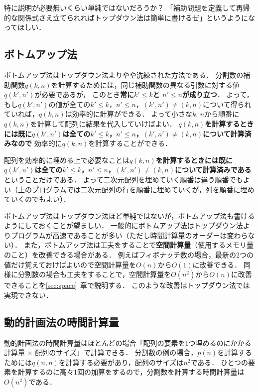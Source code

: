 \documentclass[a4paper,twoside,onecolumn,openany,article]{memoir}
\theoremstyle{remark}
\begin{document}

特に説明が必要無いくらい単純ではないだろうか？
「補助問題を定義して再帰的な関係式さえ立てられればトップダウン法は簡単に書けるぜ」というようになってほしい．

\subsection{ボトムアップ法}
ボトムアップ法はトップダウン法よりやや洗練された方法である．
分割数の補助関数$q(k,n)$を計算するためには，同じ補助関数の異なる引数に対する値$q(k',n')$が必要であるが，
このとき\textbf{常に$k'\le k$と $n'\le n$が成り立つ}．
よって，もし$q(k',n')$の値が全ての$k'\le k$，$n'\le n$，$(k',n')\ne(k,n)$について得られていれば，$q(k,n)$は効率的に計算ができる．
よって小さな$k$, $n$から順番に$q(k,n)$を計算して配列に結果を代入していけばよい．
\textbf{$q(k, n)$を計算するときには既に$q(k', n')$は全ての$k'\le k$，$n'\le n$，$(k',n')\ne (k,n)$について計算済みなので}
効率的に$q(k,n)$を計算することができる．


配列を効率的に埋める上で必要なことは\textbf{$q(k, n)$を計算するときには既に$q(k', n')$は全ての$k'\le k$，$n'\le n$，$(k',n')\ne (k,n)$について計算済みである}
ということだけである．
よって二次元配列を埋めていく順番は違う順番でもよい（上のプログラムでは二次元配列の行を順番に埋めていくが，列を順番に埋めていくのでもよい）．

ボトムアップ法はトップダウン法ほど単純ではないが，ボトムアップ法も書けるようにしておくことが望ましい．
一般的にボトムアップ法はトップダウン法よりプログラムが高速であることが多い（ただし時間計算量のオーダーは変わらない）．
また，ボトムアップ法は工夫をすることで\textbf{空間計算量}（使用するメモリ量のこと）を改善できる場合がある．
例えばフィボナッチ数の場合，最新の2つの値だけ覚えておけばよいので空間計算量を$O(n)$から$O(1)$に改善できる．
同様に分割数の場合も工夫をすることで，空間計算量を$O(n^2)$から$O(n)$に改善できることを\ref{sec:space}~章で説明する．
このような改善はトップダウン法では実現できない．


\subsection{動的計画法の時間計算量}
動的計画法の時間計算量はほとんどの場合「配列の要素を1つ埋めるのにかかる計算量 $\times$ 配列のサイズ」で計算できる．
分割数の例の場合，$p(n)$を計算するためには$q(n,n)$を計算する必要があり，配列のサイズは$n^2$である．
ひとつの要素を計算するのに高々1回の加算をするので，分割数を計算する時間計算量は$O(n^2)$である．
\end{document}
